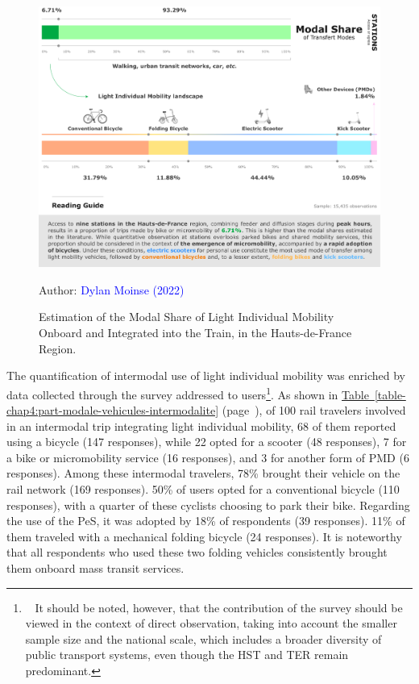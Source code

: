 \begin{refsegment}
\begin{figure}[h!]\vspace*{4pt}
    \caption{Estimation of the Modal Share of Light Individual Mobility Onboard and Integrated into the Train, in the Hauts-de-France Region.}
    \label{fig-chap4:part-modale-detaillee-mobilite-individuelle-legere}
    \centerline{\includegraphics[width=1\columnwidth]{src/Figures/Chap-4/EN_Observation_quantitative_part_modale.pdf}}
    \vspace{5pt}
    \begin{flushright}\scriptsize{
    Author: \textcolor{blue}{Dylan Moinse (2022)}
    }\end{flushright}
\end{figure}

The quantification of intermodal use of light individual mobility was enriched by data collected through the survey addressed to users\footnote{~
    It should be noted, however, that the contribution of the survey should be viewed in the context of direct observation, taking into account the smaller sample size and the national scale, which includes a broader diversity of public transport systems, even though the \acrshort{HST} and \acrshort{TER} remain predominant.
}. As shown in \hyperref[table-chap4:part-modale-vehicules-intermodalite]{Table~\ref{table-chap4:part-modale-vehicules-intermodalite}} (page~\pageref{table-chap4:part-modale-vehicules-intermodalite}), of 100 rail travelers involved in an intermodal trip integrating light individual mobility, 68 of them reported using a bicycle (147 responses), while 22 opted for a scooter (48 responses), 7 for a bike or micromobility service (16 responses), and 3 for another form of \acrshort{PMD} (6 responses). Among these intermodal travelers, 78\% brought their vehicle on the rail network (169 responses). 50\% of users opted for a conventional bicycle (110 responses), with a quarter of these cyclists choosing to park their bike. Regarding the use of the \acrshort{PeS}, it was adopted by 18\% of respondents (39 responses). 11\% of them traveled with a mechanical folding bicycle (24 responses). It is noteworthy that all respondents who used these two folding vehicles consistently brought them onboard mass transit services.%


\end{refsegment}
